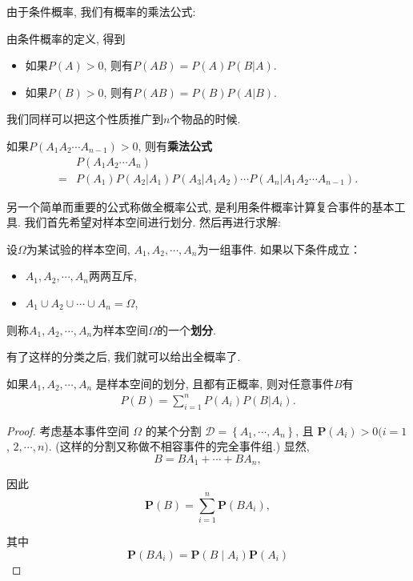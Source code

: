 由于条件概率, 我们有概率的乘法公式:

\begin{theorem}[乘法公式]
    由条件概率的定义, 得到
    \begin{itemize}
        \item 如果$P(A)>0$, 则有$P(AB)=P(A)P(B|A)$. 
        \item 如果$P(B)>0$, 则有$P(AB)=P(B)P(A|B)$. 
    \end{itemize}
\end{theorem}

我们同样可以把这个性质推广到$n$个物品的时候.

\begin{corollary}
    如果$P(A_1 A_2\cdots A_{n-1})>0$, 则有\textbf{乘法公式}
    \begin{align*}
          & P(A_1A_2\cdots A_n)                                                \\
        = & P(A_1)P(A_2|A_1)P(A_3|A_1 A_2)\cdots P(A_n|A_1 A_2\cdots A_{n-1}).
    \end{align*}
\end{corollary}



另一个简单而重要的公式称做全概率公式, 是利用条件概率计算复合事件的基本工具. 我们首先希望对样本空间进行划分. 然后再进行求解:

\begin{definition}
    设$\Omega$为某试验的样本空间, $A_1, A_2, \cdots, A_n$为一组事件. 如果以下条件成立：
    \begin{itemize}
        \item $A_1, A_2, \cdots, A_n$两两互斥, 
        \item $A_1 \cup A_2 \cup \cdots \cup A_n=\Omega$, 
    \end{itemize}
    则称$A_1, A_2, \cdots , A_n$为样本空间$\Omega$的一个\textbf{划分}. 
\end{definition}


有了这样的分类之后, 我们就可以给出全概率了.

\begin{theorem}[全概率公式]
    如果$A_1, A_2, \cdots, A_n$ 是样本空间的划分, 且都有正概率, 则对任意事件$B$有
    \begin{align*}
        P(B)=\sum_{i=1}^n P(A_i) P(B|A_i).
    \end{align*}
\end{theorem}

\begin{proof}
    考虑基本事件空间 $\Omega$ 的某个分割 $\mathscr{D}=\left\{A_1, \cdots, A_n\right\}$, 且 $\mathbf{P}\left(A_i\right)>0(i=1$, $2, \cdots, n)$. (这样的分割又称做不相容事件的完全事件组.) 显然,
$$
B=B A_1+\cdots+B A_n,
$$

因此
$$
\mathbf{P}(B)=\sum_{i=1}^n \mathbf{P}\left(B A_i\right),
$$

其中
$$
\mathbf{P}\left(B A_i\right)=\mathbf{P}\left(B \mid A_i\right) \mathbf{P}\left(A_i\right)
$$
\end{proof}


